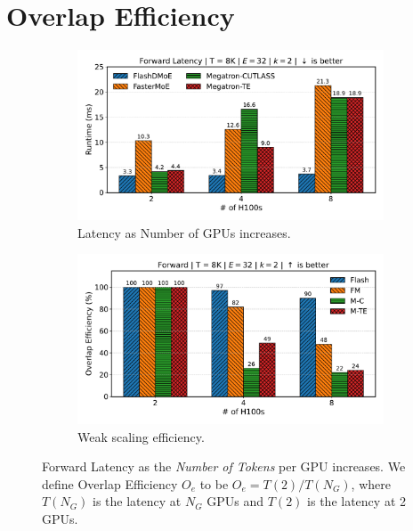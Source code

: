 \section{Overlap Efficiency}\label{sec:overlap-efficiency}
\begin{figure}[!h]
    \centering
    \begin{subfigure}{0.49\textwidth}
        \centering
        \includegraphics[width=\linewidth, keepaspectratio]{figures/scaling_gpus_8}
        \caption{Latency as Number of GPUs increases.}
        \label{fig:lng}
    \end{subfigure}
    \begin{subfigure}{0.49\textwidth}
        \centering
        \includegraphics[width=\linewidth, keepaspectratio]{figures/overlap_efficiency_8}
        \caption{Weak scaling efficiency.}
        \label{fig:oe}
    \end{subfigure}
    \caption{Forward Latency as the \emph{Number of Tokens} per GPU increases. We define Overlap Efficiency $O_e$
        to be $O_e = T(2) / T(N_G)$, where $T(N_G)$ is the latency at $N_G$ GPUs and $T(2)$ is the latency at 2 GPUs.}
    \label{fig:oet}
\end{figure}
